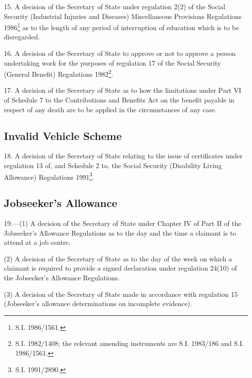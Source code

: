 \documentclass[12pt,a4paper]{article}
\begin{document}
\medskip

15.  A decision of the Secretary of State under regulation 2(2) of the Social Security (Industrial Injuries and Diseases) Miscellaneous Provisions Regulations 1986\footnote{\frenchspacing S.I. 1986/1561.} as to the length of any period of interruption of education which is to be disregarded.

\medskip

16.  A decision of the Secretary of State to approve or not to approve a person undertaking work for the purposes of regulation 17 of the Social Security (General Benefit) Regulations 1982\footnote{\frenchspacing S.I. 1982/1408; the relevant amending instruments are S.I. 1983/186 and S.I. 1986/1561.}.

\medskip

17.  A decision of the Secretary of State as to how the limitations under Part VI of Schedule 7 to the Contributions and Benefits Act on the benefit payable in respect of any death are to be applied in the circumstances of any case.

\subsection*{Invalid Vehicle Scheme}

18.  A decision of the Secretary of State relating to the issue of certificates under regulation 13 of, and Schedule 2 to, the Social Security (Disability Living Allowance) Regulations 1991\footnote{\frenchspacing S.I. 1991/2890.}.

\subsection*{Jobseeker’s Allowance}

19.—(1) A decision of the Secretary of State under Chapter IV of Part II of the Jobseeker’s Allowance Regulations as to the day and the time a claimant is to attend at a job centre.

(2) A decision of the Secretary of State as to the day of the week on which a claimant is required to provide a signed declaration under regulation 24(10) of the Jobseeker’s Allowance Regulations.

(3) A decision of the Secretary of State 
made in accordance with regulation 15 (Jobseeker’s allowance determinations on incomplete evidence).

\end{document}
